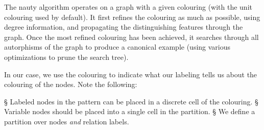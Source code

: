 \documentclass[letterpaper]{article} %
\begin{document}
The nauty algorithm operates on a graph with a given colouring (with the unit colouring used by default). It first refines the colouring as much as possible, using degree information, and propagating the distinguishing features through the graph. Once the most refined colouring has been achieved, it searches through all autorphisms of the graph to produce a canonical example (using various optimizations to prune the search tree).

In our case, we use the colouring to indicate what our labeling tells us about the colouring of the nodes.
Note the following:
\begin{easylist}
§ Labeled nodes in the pattern can be placed in a discrete cell of the colouring.
§ Variable nodes should be placed into a single cell in the partition.
§ We define a partition over nodes \emph{and} relation labels. 
\end{easylist}
\end{document}
